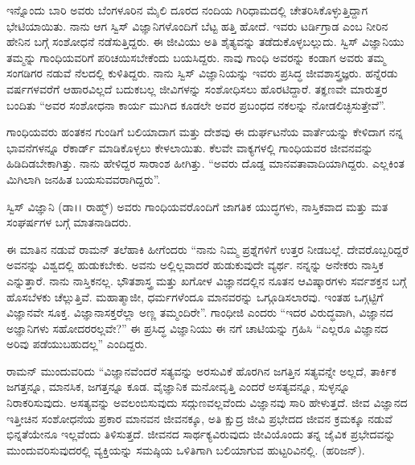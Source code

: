 \vskip 2pt

ಇನ್ನೊಂದು ಬಾರಿ ಅವರು ಬೆಂಗಳೂರಿನ  ಮೈಲಿ ದೂರದ ನಂದಿಯ ಗಿರಿಧಾಮದಲ್ಲಿ ಚೇತರಿಸಿಕೊಳ್ಳುತ್ತಿದ್ದಾಗ ಭೇಟಿಯಾಯಿತು. ನಾನು ಆಗ ಸ್ವಿಸ್ ವಿಜ್ಞಾನಿಗಳೊಂದಿಗೆ ಬೆಟ್ಟ ಹತ್ತಿ ಹೋದೆ. ಇವರು ಟರ್ಡಿಗ್ರಾಡ ಎಂಬ ನೀರಿನ ಹೇನಿನ ಬಗ್ಗೆ ಸಂಶೋಧನೆ ನಡೆಸುತ್ತಿದ್ದರು. ಈ ಜೀವಿಯು ಅತಿ ಶೈತ್ಯವನ್ನು ತಡೆದುಕೊಳ್ಳಬಲ್ಲುದು. ಸ್ವಿಸ್ ವಿಜ್ಞಾನಿಯು ತಮ್ಮನ್ನು ಗಾಂಧಿಯವರಿಗೆ ಪರಿಚಯಿಸಬೇಕೆಂದು ಬಯಸಿದ್ದರು. ನಾವು ಗಾಂಧಿ ಅವರನ್ನು ಕಂಡಾಗ ಅವರು ತಮ್ಮ ಸಂಗಡಿಗರ ನಡುವೆ ನೆಲದಲ್ಲಿ ಕುಳಿತಿದ್ದರು. ನಾನು ಸ್ವಿಸ್ ವಿಜ್ಞಾನಿಯನ್ನು ಇವರು ಪ್ರಸಿದ್ಧ ಜೀವಶಾಸ್ತ್ರಜ್ಞರು. ಹನ್ನೆರಡು ವರ್ಷಗಳವರೆಗೆ ಆಹಾರವಿಲ್ಲದೆ ಬದುಕಬಲ್ಲ ಜೀವಿಗಳನ್ನು ಸಂಶೋಧಿಸಲು ಹೊರಟಿದ್ದಾರೆ. ತಕ್ಞಣವೇ ಮಾರುತ್ತರ ಬಂದಿತು “ಅವರ ಸಂಶೋಧನಾ ಕಾರ್ಯ ಮುಗಿದ ಕೂಡಲೇ ಅವರ ಪ್ರಬಂಧದ ನಕಲನ್ನು ನೋಡಲಿಚ್ಛಿಸುತ್ತೇವೆ”.

\vskip 2pt

ಗಾಂಧಿಯವರು ಹಂತಕನ ಗುಂಡಿಗೆ ಬಲಿಯಾದಾಗ ಮತ್ತು ದೇಶವು ಈ ದುರ್ಘಟನೆಯ ವಾರ್ತೆ\-ಯನ್ನು ಕೇಳಿದಾಗ ನನ್ನ ಭಾವನೆಗಳನ್ನೂ ರೆಕಾರ್ಡ್ ಮಾಡಿಕೊಳ್ಳಲು ಕೇಳಲಾಯಿತು. ಕೆಲವೇ ವಾಕ್ಯ\-ಗಳಲ್ಲಿ ಗಾಂಧಿಯವರ ಜೀವನವನ್ನು ಹಿಡಿದಿಡಬೇಕಾಗಿತ್ತು. ನಾನು ಹೇಳಿದ್ದರ ಸಾರಾಂಶ ಹೀಗಿತ್ತು.\- “ಅವರು ದೊಡ್ಡ ಮಾನವತಾವಾದಿಯಾಗಿದ್ದರು. ಎಲ್ಲಕಿಂತ ಮಿಗಿಲಾಗಿ ಜನಹಿತ ಬಯಸುವವರಾಗಿದ್ದರು”.

\vskip 2pt

ಸ್ವಿಸ್ ವಿಜ್ಞಾನಿ (ಡಾ।। ರಾಹ್ಮ್) ಅವರು ಗಾಂಧಿಯವರೊಂದಿಗೆ ಜಾಗತಿಕ ಯುದ್ಧಗಳು, ನಾಸ್ತಿಕವಾದ ಮತ್ತು ಮತ ಸಂಘರ್ಷಗಳ ಬಗ್ಗೆ ಮಾತನಾಡಿದರು.

\vskip 2pt

ಈ ಮಾತಿನ ನಡುವೆ ರಾಮನ್ ತಲೆಹಾಕಿ ಹೀಗೆಂದರು “ನಾನು ನಿಮ್ಮ ಪ್ರಶ್ನೆಗಳಿಗೆ ಉತ್ತರ ನೀಡಬಲ್ಲೆ. ದೇವರೊಬ್ಬರಿದ್ದರೆ ಅವನನ್ನು ವಿಶ್ವದಲ್ಲಿ ಹುಡುಕಬೇಕು. ಅವನು ಅಲ್ಲಿಲ್ಲವಾದರೆ ಹುಡುಕುವುದೇ ವ್ಯರ್ಥ. ನನ್ನನ್ನು ಅನೇಕರು ನಾಸ್ತಿಕ ಎನ್ನುತ್ತಾರೆ. ನಾನು ನಾಸ್ತಿಕನಲ್ಲ. ಭೌತಶಾಸ್ತ್ರ ಮತ್ತು ಖಗೋಳ ವಿಜ್ಞಾನದಲ್ಲಿನ ನೂತನ ಆವಿಷ್ಕಾರಗಳು ಸರ್ವಶಕ್ತನ ಬಗ್ಗೆ ಹೊಸಬೆಳಕು ಚೆಲ್ಲುತ್ತಿವೆ. ಮಹಾತ್ಮಾಜೀ, ಧರ್ಮಗಳೆಂದೂ ಮಾನವರನ್ನು ಒಗ್ಗೂಡಿಸಲಾರವು. ಇಂತಹ ಒಗ್ಗಟ್ಟಿಗೆ ವಿಜ್ಞಾನವೇ ಸೂಕ್ತ. ವಿಜ್ಞಾನಾಸಕ್ತರೆಲ್ಲಾ ಅಣ್ಣ ತಮ್ಮಂದಿರೇ”. ಗಾಂಧೀಜಿ ಎಂದರು\enginline{-} “ಇದರ ವಿರುದ್ಧವಾಗಿ, ವಿಜ್ಞಾನದ ಅಜ್ಞಾನಿಗಳು ಸಹೋದರರಲ್ಲವೇ?” ಈ ಪ್ರಸಿದ್ಧ ವಿಜ್ಞಾನಿಯು ಈ ನಗೆ ಚಾಟಿಯನ್ನು ಗ್ರಹಿಸಿ \enginline{-} “ಎಲ್ಲರೂ ವಿಜ್ಞಾನದ ಅರಿವು ಪಡೆಯುಬಹುದಲ್ಲ” ಎಂದಿದ್ದರು.

\vskip 2pt

ರಾಮನ್ ಮುಂದುವರಿದು \enginline{-} “ವಿಜ್ಞಾನವೆಂದರೆ ಸತ್ಯವನ್ನು ಅರಸುವಿಕೆ \enginline{-} ಹೊರಗಿನ ಜಗತ್ತಿನ ಸತ್ಯವನ್ನೇ ಅಲ್ಲದೆ, ತಾರ್ಕಿಕ ಜಗತ್ತನ್ನೂ, ಮಾನಸಿಕ, ಜಗತ್ತನ್ನೂ ಕೂಡ. ವೈಜ್ಞಾನಿಕ ಮನೋವೃತ್ತಿ ಎಂದರೆ ಅಸತ್ಯವನ್ನೂ, ಸುಳ್ಳನ್ನೂ ನಿರಾಕರಿಸುವುದು. ಅಸತ್ಯವನ್ನು ಅವಲಂಬಿಸುವುದು ಸದ್ಗುಣ\-ವಲ್ಲವೆಂದು ವಿಜ್ಞಾನವು ಸಾರಿ ಹೇಳುತ್ತದೆ. ಜೀವ ವಿಜ್ಞಾನದ ಇತ್ತೀಚಿನ ಸಂಶೋಧನೆಯ ಪ್ರಕಾರ ಮಾನವನ ಜೀವನಕ್ಕೂ, ಅತಿ ಕ್ಷುದ್ರ ಜೀವಿ ಪ್ರಭೇದದ ಜೀವನ ಕ್ರಮಕ್ಕೂ ನಡುವೆ ಭಿನ್ನತೆಯೇನೂ ಇಲ್ಲವೆಂದು ತಿಳಿಸುತ್ತದೆ. ಜೀವನದ ಸಾರ್ಥಕ್ಯವಿರುವುದು ಜೀವಿಯೊಂದು ತನ್ನ ಜೈವಿಕ ಪ್ರಭೇದವನ್ನು ಮುಂದುವರಿಸುವುದರಲ್ಲಿ \enginline{-} ವ್ಯಕ್ತಿಯನ್ನು ಸಮಷ್ಠಿಯ ಒಳಿತಿಗಾಗಿ ಬಲಿಯಾಗುವ ಹುಟ್ಟರಿವಿನಲ್ಲಿ. (ಹರಿಜನ್\enginline{-}).

